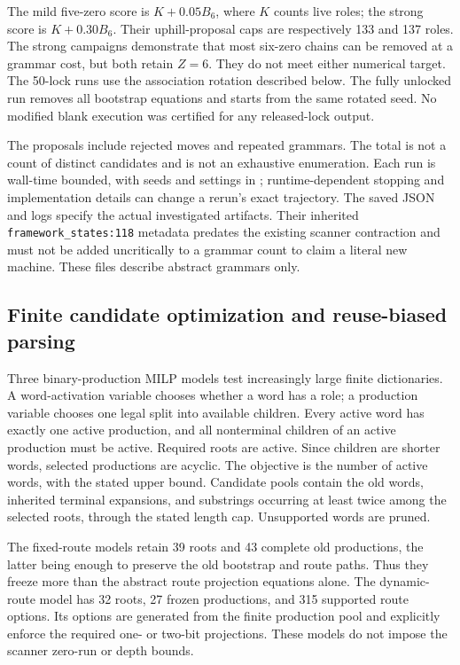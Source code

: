 The mild five-zero score is $K+0.05B_6$, where $K$ counts live roles; the
strong score is $K+0.30B_6$.  Their uphill-proposal caps are respectively
133 and 137 roles.  The strong campaigns demonstrate that most six-zero
chains can be removed at a grammar cost, but both retain $Z=6$.  They do
not meet either numerical target.  The 50-lock runs use the association
rotation described below.  The fully unlocked run removes all bootstrap
equations and starts from the same rotated seed.  No modified blank
execution was certified for any released-lock output.

The proposals include rejected moves and repeated grammars.  The total is
not a count of distinct candidates and is not an exhaustive enumeration.
Each run is wall-time bounded, with seeds and settings in
; runtime-dependent stopping and
implementation details can change a rerun's exact trajectory.  The saved
JSON and logs specify the actual investigated artifacts.  Their inherited
\texttt{framework\_states:118} metadata predates the existing scanner
contraction and must not be added uncritically to a grammar count to claim
a literal new machine.  These files describe abstract grammars only.

\subsection{Finite candidate optimization and reuse-biased parsing}

Three binary-production MILP models test increasingly large finite
dictionaries.  A word-activation variable chooses whether a word has a
role; a production variable chooses one legal split into available
children.  Every active word has exactly one active production, and all
nonterminal children of an active production must be active.  Required
roots are active.  Since children are shorter words, selected productions
are acyclic.  The objective is the number of active words, with the stated
upper bound.  Candidate pools contain the old words, inherited terminal
expansions, and substrings occurring at least twice among the selected
roots, through the stated length cap.  Unsupported words are pruned.

The fixed-route models retain 39 roots and 43 complete old productions,
the latter being enough to preserve the old bootstrap and route paths.
Thus they freeze more than the abstract route projection equations alone.
The dynamic-route model has 32 roots, 27 frozen productions, and 315
supported route options.  Its options are generated from the finite
production pool and explicitly enforce the required one- or two-bit
projections.  These models do not impose the scanner zero-run or depth
bounds.

